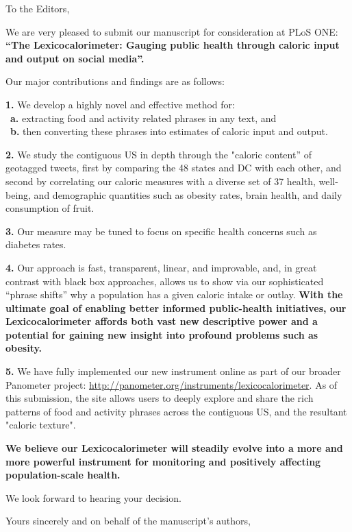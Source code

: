 
To the Editors,

We are very pleased to submit our manuscript for consideration at PLoS
ONE:\\
\textbf{``The Lexicocalorimeter:
Gauging public health through caloric input and output on social media''.}

Our major contributions and findings are as follows:

\textbf{1.}
We develop a highly novel and effective method for:\\
\mbox{}\ \textbf{a.} extracting food and activity
related phrases in any text, and \\
\mbox{}\ \textbf{b.} then converting
these phrases into estimates of caloric input and output.

\textbf{2.}
We study the contiguous US in depth through the
"caloric content'' of geotagged tweets, 
first by comparing 
the 48 states and DC with each other, and second by correlating our
caloric measures with a diverse set of 37 health, well-being, and demographic
quantities
such as obesity rates, brain health, and daily consumption of fruit.

\textbf{3.}
Our measure may be tuned to focus on specific health concerns
such as diabetes rates.

\textbf{4.}
Our approach is fast, transparent, linear, and improvable,
and, in great contrast with black box approaches, allows
us to show via our sophisticated ``phrase shifts''
why a population has a given caloric intake or outlay.
\textbf{
With the ultimate goal of enabling better informed public-health initiatives,
our Lexicocalorimeter affords both vast new descriptive power
and a potential for gaining new insight into profound problems
such as obesity.}

\textbf{5.}
We have fully implemented our new instrument online as part of
our broader Panometer project: \url{http://panometer.org/instruments/lexicocalorimeter}.
As of this submission, the site allows users to deeply explore and
share the rich patterns of food and activity
phrases across the contiguous US, and the resultant "caloric texture".

\textbf{We believe our Lexicocalorimeter will steadily evolve
into a more and more powerful instrument for monitoring and positively
affecting population-scale health.}

We look forward to hearing your decision.

Yours sincerely and on behalf of the manuscript's authors,


